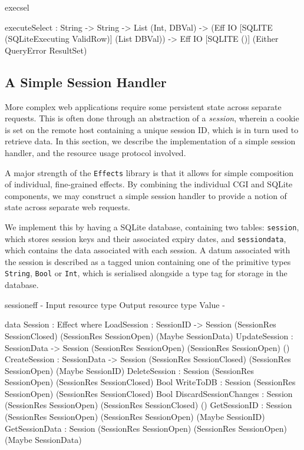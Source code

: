 \begin{SaveVerbatim}{execsel}

executeSelect : 
  String -> String -> List (Int, DBVal) -> 
  (Eff IO [SQLITE (SQLiteExecuting ValidRow)] (List DBVal)) -> 
  Eff IO [SQLITE ()] (Either QueryError ResultSet)
 
\end{SaveVerbatim}

\subsection{A Simple Session Handler}
More complex web applications require some persistent state across separate
requests. This is often done through an abstraction of a \textit{session},
wherein a cookie is set on the remote host containing a unique session ID,
which is in turn used to retrieve data. In this section, we describe the
implementation of a simple session handler, and the resource usage protocol
involved. 

A major strength of the \texttt{Effects} library is that it allows for simple
composition of individual, fine-grained effects. By combining the individual
CGI and SQLite components, we may construct a simple session handler to provide
a notion of state across separate web requests. 

We implement this by having a SQLite database, containing two tables:
\texttt{session}, which stores session keys and their associated expiry dates,
and \texttt{sessiondata}, which contains the data associated with each session.
A datum associated with the session is described as a tagged union containing
one of the primitive types \texttt{String}, \texttt{Bool} or \texttt{Int},
which is serialised alongside a type tag for storage in the database.

\begin{SaveVerbatim}{sessioneff}
{-                        { Input resource type }            { Output resource type }   { Value }        -}

data Session : Effect where
  LoadSession           : SessionID -> 
                          Session (SessionRes SessionClosed) (SessionRes SessionOpen)   (Maybe SessionData)
  UpdateSession         : SessionData -> 
                          Session (SessionRes SessionOpen)   (SessionRes SessionOpen)   ()
  CreateSession         : SessionData -> 
                          Session (SessionRes SessionClosed) (SessionRes SessionOpen)   (Maybe SessionID)
  DeleteSession         : Session (SessionRes SessionOpen)   (SessionRes SessionClosed) Bool 
  WriteToDB             : Session (SessionRes SessionOpen)   (SessionRes SessionClosed) Bool
  DiscardSessionChanges : Session (SessionRes SessionOpen)   (SessionRes SessionClosed) ()
  GetSessionID          : Session (SessionRes SessionOpen)   (SessionRes SessionOpen)   (Maybe SessionID)
  GetSessionData        : Session (SessionRes SessionOpen)   (SessionRes SessionOpen)   (Maybe SessionData)
\end{SaveVerbatim}


